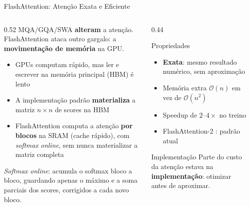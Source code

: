\documentclass[aspectratio=169, xcolor=dvipsnames]{beamer}
\begin{document}
  \begin{frame}{FlashAttention: Atenção Exata e Eficiente \cite{dao2022flashattention}}
    \begin{columns}[T]
      \begin{column}{0.52\textwidth}
        \small MQA/GQA/SWA \textbf{alteram} a atenção. FlashAttention ataca outro gargalo: a \textbf{movimentação de memória} na GPU.\\[0.4em]
        \begin{itemize}
          \item GPUs computam rápido, mas ler e escrever na memória principal (HBM) é lento
          \item A implementação padrão \textbf{materializa} a matriz $n \times n$ de scores na HBM
          \item FlashAttention computa a atenção \textbf{por blocos} na SRAM (cache rápido), com \textit{softmax online}, sem nunca materializar a matriz completa
        \end{itemize}
        \vspace{0.2em}
        {\scriptsize \textit{Softmax online}: acumula o softmax bloco a bloco, guardando apenas o máximo e a soma parciais dos scores, corrigidos a cada novo bloco.}
      \end{column}
      \begin{column}{0.44\textwidth}
        \begin{block}{Propriedades}
          \begin{itemize}
            \item \textbf{Exata}: mesmo resultado numérico, sem aproximação
            \item Memória extra $\mathcal{O}(n)$ em vez de $\mathcal{O}(n^2)$
            \item Speedup de $2$--$4\times$ no treino
            \item FlashAttention-2 \cite{dao2023flashattention2}: padrão atual
          \end{itemize}
        \end{block}
        \begin{alertblock}{Implementação}
          Parte do custo da atenção estava na \textbf{implementação}: otimizar antes de aproximar.
        \end{alertblock}
      \end{column}
    \end{columns}
  \end{frame}
\end{document}
